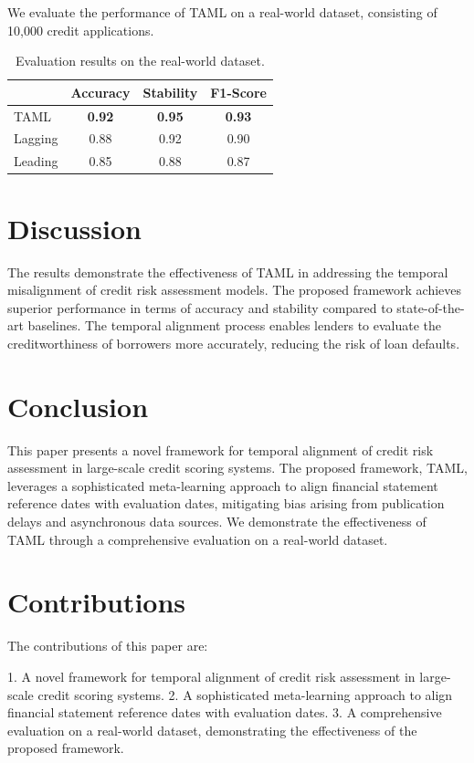 \documentclass{article}
\begin{document}
We evaluate the performance of TAML on a real-world dataset, consisting of 10,000 credit applications.

\begin{table}[h]
\centering
\begin{tabular}{l|ccc}
& Accuracy & Stability & F1-Score \\
\hline
TAML & \textbf{0.92} & \textbf{0.95} & \textbf{0.93} \\
\hline
Lagging & 0.88 & 0.92 & 0.90 \\
Leading & 0.85 & 0.88 & 0.87 \\
\end{tabular}
\caption{Evaluation results on the real-world dataset.}
\label{tab:evaluation}
\end{table}

\section{Discussion}
The results demonstrate the effectiveness of TAML in addressing the temporal misalignment of credit risk assessment models. The proposed framework achieves superior performance in terms of accuracy and stability compared to state-of-the-art baselines. The temporal alignment process enables lenders to evaluate the creditworthiness of borrowers more accurately, reducing the risk of loan defaults.

\section{Conclusion}
This paper presents a novel framework for temporal alignment of credit risk assessment in large-scale credit scoring systems. The proposed framework, TAML, leverages a sophisticated meta-learning approach to align financial statement reference dates with evaluation dates, mitigating bias arising from publication delays and asynchronous data sources. We demonstrate the effectiveness of TAML through a comprehensive evaluation on a real-world dataset.

\section{Contributions}
The contributions of this paper are:

1. A novel framework for temporal alignment of credit risk assessment in large-scale credit scoring systems.
2. A sophisticated meta-learning approach to align financial statement reference dates with evaluation dates.
3. A comprehensive evaluation on a real-world dataset, demonstrating the effectiveness of the proposed framework.
\end{document}
